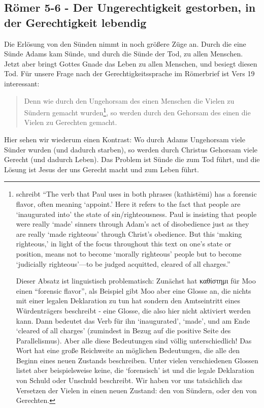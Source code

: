 \subsection{Römer 5-6 - Der Ungerechtigkeit gestorben, in der Gerechtigkeit lebendig}
Die Erlösung von den Sünden nimmt in  noch größere Züge an.
Durch die eine Sünde Adams kam Sünde, und durch die Sünde der Tod, zu allen Menschen.
Jetzt aber bringt Gottes Gnade das Leben zu allen Menschen, und besiegt diesen Tod.
Für unsere Frage nach der Gerechtigkeitssprache im Römerbrief ist Vers 19 interessant:
\begin{quote}
	Denn wie durch den Ungehorsam des einen Menschen die Vielen zu Sündern gemacht wurden\footnote{
		\Cite[371]{nicnt-romans} schreibt ``The verb that Paul uses in both phrases (kathistēmi) has a forensic flavor, often meaning `appoint.'
		Here it refers to the fact that people are `inaugurated into' the state of sin/righteousness.
		Paul is insisting that people were really `made' sinners through Adam’s act of disobedience just as they are really `made righteous' through Christ’s obedience.
		But this `making righteous,' in light of the focus throughout this text on one’s state or position,
		means not to become `morally righteous' people but to become `judicially righteous'—to be judged acquitted, cleared of all charges.''

		Dieser Absatz ist linguistisch problematisch: Zunächst hat καθίστημι für Moo einen ``forensic flavor'', als Beispiel gibt Moo aber eine Glosse an,
		die nichts mit einer legalen Deklaration zu tun hat sondern den Amtseintritt eines Würdenträgers beschreibt - eine Glosse, die also hier nicht aktiviert werden kann.
		Dann bedeutet das Verb für ihn `inaugurated', `made', und am Ende `cleared of all charges' (zumindest in Bezug auf die positive Seite des Parallelismus).
		Aber alle diese Bedeutungen sind völlig unterschiedlich!
		Das Wort hat eine große Reichweite an möglichen Bedeutungen, die alle den Beginn eines neuen Zustands beschreiben.
		Unter vielen verschiedenen Glossen listet aber beispielsweise \Cite[καθίστημι]{lsj} keine, die `forensisch' ist und die
		legale Deklaration von Schuld oder Unschuld beschreibt.
		Wir haben vor uns tatsächlich das Versetzen der Vielen in einen neuen Zustand: den von Sündern, oder den von Gerechten.
	},
	so werden durch den Gehorsam des einen die Vielen zu Gerechten gemacht.
\end{quote}
Hier sehen wir wiederum einen Kontrast:
Wo durch Adams Ungehorsam viele Sünder wurden (und dadurch starben), so werden durch Christus Gehorsam viele Gerecht (und dadurch Leben).
Das Problem ist Sünde die zum Tod führt, und die Lösung ist Jesus der uns Gerecht macht und zum Leben führt.

